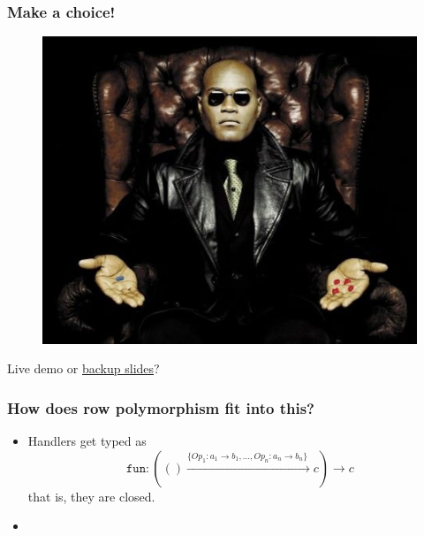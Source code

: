 \begin{frame}[label={choice}]
  \frametitle{Make a choice!}
  \begin{center}    
    \begin{figure}
      \includegraphics[scale=0.2]{choice.jpg}
    \end{figure}
    Live demo or \hyperlink{backup}{backup slides}?
  \end{center}
\end{frame}

\begin{frame}
  \frametitle{How does row polymorphism fit into this?}
  \begin{itemize}
    \item Handlers get typed as
  \[ \texttt{fun} : (() \xrightarrow{\{Op_1:a_1 \to b_1,\dots,Op_n:a_n \to b_n \}\;} c) \to c \]
  that is, they are closed.\\
\item {}

\end{itemize}
\end{frame}

